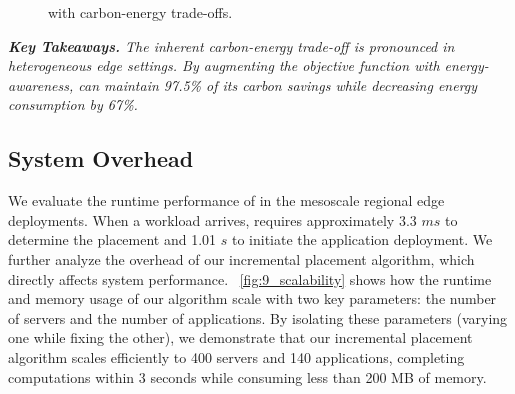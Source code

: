 \begin{figure}[tb]
    \centering
    \hfill
    \caption{\proposedsystem with carbon-energy trade-offs.} 
    \label{fig:carbon_energy}
    \vspace{-.3cm}
\end{figure}



\noindent \textit{\textbf{Key Takeaways.} 
The inherent carbon-energy trade-off is  pronounced in heterogeneous edge settings. By augmenting the objective function with energy-awareness, \proposedsystem can maintain 97.5\% of its carbon savings while decreasing energy consumption by 67\%.
}

\subsection{System Overhead}\label{sec:eval_overhead}
We evaluate the runtime performance of \proposedsystem in the mesoscale regional edge deployments. When a workload arrives, \proposedsystem requires approximately 3.3 $ms$ to determine the placement and  1.01 $s$ to initiate the application deployment. We further analyze the overhead of our incremental placement algorithm, which directly affects system performance. ~\autoref{fig:9_scalability} shows how the runtime and memory usage of our algorithm scale with two key parameters: the number of servers and the number of applications. By isolating these parameters (varying one while fixing the other), we demonstrate that our incremental placement algorithm scales efficiently to 400 servers and 140 applications, completing computations within 3 seconds while consuming less than 200 MB of memory. %




